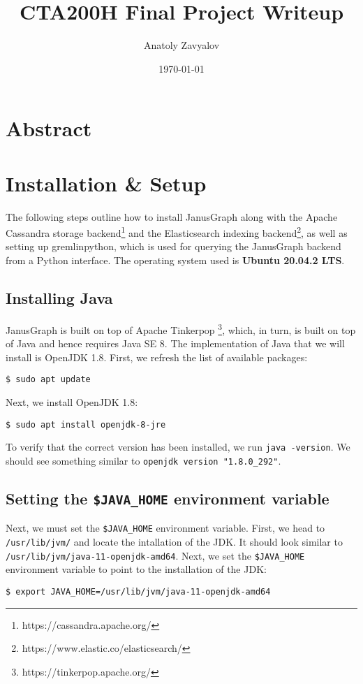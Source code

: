 \documentclass[12pt]{article}
\newcommand{\code}[1]{\colorbox{backcolour}{\texttt{#1}}}
\begin{document}
\title{CTA200H Final Project Writeup}
\author{Anatoly Zavyalov}
\date{\today}
\maketitle

\section{Abstract}

\section{Installation \& Setup}

The following steps outline how to install JanusGraph along with the Apache Cassandra storage backend\footnote{https://cassandra.apache.org/} and the Elasticsearch indexing backend\footnote{https://www.elastic.co/elasticsearch/}, as well as setting up gremlinpython, which is used for querying the JanusGraph backend from a Python interface. The operating system used is \textbf{Ubuntu 20.04.2 LTS}.

\subsection{Installing Java}

JanusGraph is built on top of Apache Tinkerpop \footnote{https://tinkerpop.apache.org/}, which, in turn, is built on top of Java and hence requires Java SE 8. The implementation of Java that we will install is OpenJDK 1.8. First, we refresh the list of available packages:
\begin{lstlisting}[numbers=none]
$ sudo apt update
\end{lstlisting} 

Next, we install OpenJDK 1.8:
\begin{lstlisting}[numbers=none]
$ sudo apt install openjdk-8-jre
\end{lstlisting}

To verify that the correct version has been installed, we run \code{java -version}. We should see something similar to \code{openjdk version "1.8.0\_292"}. 

\subsection{Setting the \code{\$JAVA\_HOME} environment variable}
Next, we must set the \code{\$JAVA\_HOME} environment variable. First, we head to \code{/usr/lib/jvm/} and locate the intallation of the JDK. It should look similar to \code{/usr/lib/jvm/java-11-openjdk-amd64}. Next, we set the \code{\$JAVA\_HOME} environment variable to point to the installation of the JDK:
\begin{lstlisting}[numbers=none]
$ export JAVA_HOME=/usr/lib/jvm/java-11-openjdk-amd64 
\end{lstlisting}
\end{document}
